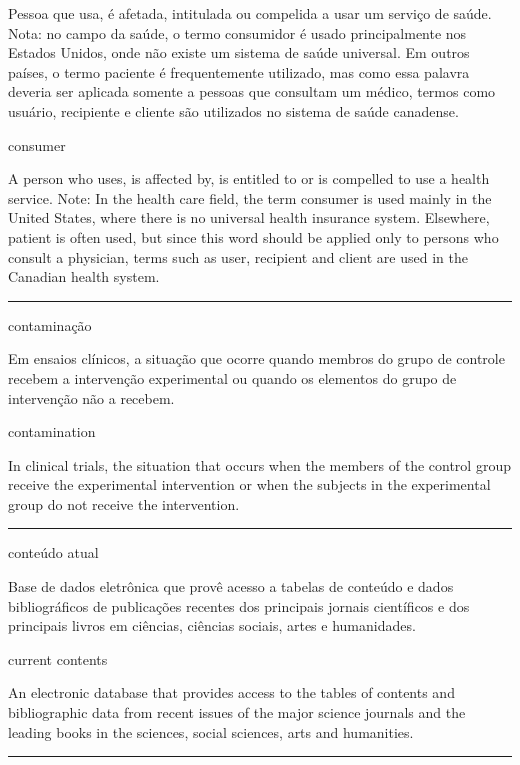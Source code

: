 \documentclass[
]{book}
\begin{document}
Pessoa que usa, é afetada, intitulada ou compelida a usar um serviço de saúde. Nota: no campo da saúde, o termo consumidor é usado principalmente nos Estados Unidos, onde não existe um sistema de saúde universal. Em outros países, o termo paciente é frequentemente utilizado, mas como essa palavra deveria ser aplicada somente a pessoas que consultam um médico, termos como usuário, recipiente e cliente são utilizados no sistema de saúde canadense.

consumer

A person who uses, is affected by, is entitled to or is compelled to use a health service. Note: In the health care field, the term consumer is used mainly in the United States, where there is no universal health insurance system. Elsewhere, patient is often used, but since this word should be applied only to persons who consult a physician, terms such as user, recipient and client are used in the Canadian health system.

\begin{center}\rule{0.5\linewidth}{0.5pt}\end{center}

contaminação

Em ensaios clínicos, a situação que ocorre quando membros do grupo de controle recebem a intervenção experimental ou quando os elementos do grupo de intervenção não a recebem.

contamination

In clinical trials, the situation that occurs when the members of the control group receive the experimental intervention or when the subjects in the experimental group do not receive the intervention.

\begin{center}\rule{0.5\linewidth}{0.5pt}\end{center}

conteúdo atual

Base de dados eletrônica que provê acesso a tabelas de conteúdo e dados bibliográficos de publicações recentes dos principais jornais científicos e dos principais livros em ciências, ciências sociais, artes e humanidades.

current contents

An electronic database that provides access to the tables of contents and bibliographic data from recent issues of the major science journals and the leading books in the sciences, social sciences, arts and humanities.

\begin{center}\rule{0.5\linewidth}{0.5pt}\end{center}
\end{document}
